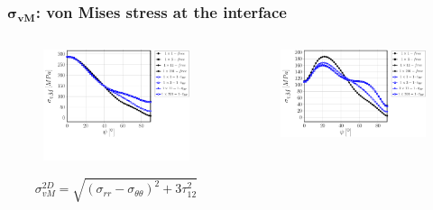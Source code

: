 \documentclass[first,firstsupp,lastsupp,last,hyperref,table]{ETHclass}
\begin{document}
\begin{frame}
\frametitle{\vspace{0.2cm}\small $\mathbf{\sigma_{vM}}$: von Mises stress at the interface}
\vspace{-.75cm}
\centering
\begin{columns}[c]
\centering
\begin{column}{0.5\textwidth}
\centering
\begin{figure}
\centering
\includegraphics[width=\columnwidth]{vf60-nodamage-vM2D-notol.pdf}
\end{figure}
\vspace{-0.9cm}
\scriptsize
\begin{equation*}
\sigma^{2D}_{vM}=\sqrt{\left(\sigma_{rr}-\sigma_{\theta\theta}\right)^{2}+3\tau_{12}^{2}}
\end{equation*}
\end{column}
\begin{column}{0.5\textwidth}
\centering
\begin{figure}
\centering
\includegraphics[width=\columnwidth]{vf60-nodamage-vM3D.pdf}

\end{figure}
\end{column}
\end{columns}
\end{frame}
\end{document}

